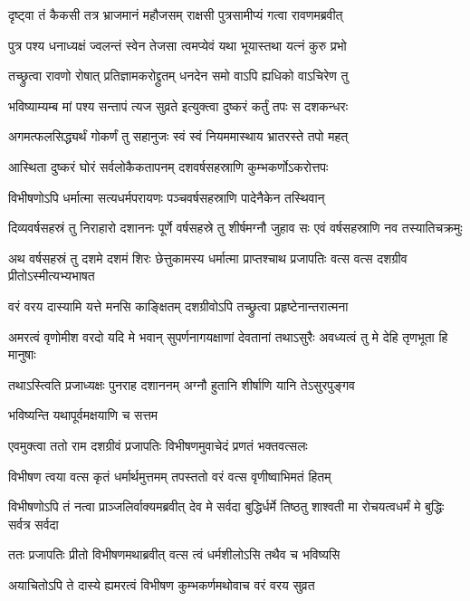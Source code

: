 \twolineshloka
{दृष्ट्वा तं कैकसी तत्र भ्राजमानं महौजसम्}
{राक्षसी पुत्रसामीप्यं गत्वा रावणमब्रवीत्} %

\twolineshloka
{पुत्र पश्य धनाध्यक्षं ज्वलन्तं स्वेन तेजसा}
{त्वमप्येवं यथा भूयास्तथा यत्नं कुरु प्रभो} %

\twolineshloka
{तच्छ्रुत्वा रावणो रोषात् प्रतिज्ञामकरोद्द्रुतम्}
{धनदेन समो वाऽपि ह्यधिको वाऽचिरेण तु} %

\twolineshloka
{भविष्याम्यम्ब मां पश्य सन्तापं त्यज सुव्रते}
{इत्युक्त्वा दुष्करं कर्तुं तपः स दशकन्धरः} %

\twolineshloka
{अगमत्फलसिद्ध्यर्थं गोकर्णं तु सहानुजः}
{स्वं स्वं नियममास्थाय भ्रातरस्ते तपो महत्} %

\twolineshloka
{आस्थिता दुष्करं घोरं सर्वलोकैकतापनम्}
{दशवर्षसहस्राणि कुम्भकर्णोऽकरोत्तपः} %

\twolineshloka
{विभीषणोऽपि धर्मात्मा सत्यधर्मपरायणः}
{पञ्चवर्षसहस्राणि पादेनैकेन तस्थिवान्} %

\threelineshloka
{दिव्यवर्षसहस्रं तु निराहारो दशाननः}
{पूर्णे वर्षसहस्रे तु शीर्षमग्नौ जुहाव सः}
{एवं वर्षसहस्राणि नव तस्यातिचक्रमुः} %

\threelineshloka
{अथ वर्षसहस्रं तु दशमे दशमं शिरः}
{छेत्तुकामस्य धर्मात्मा प्राप्तश्चाथ प्रजापतिः}
{वत्स वत्स दशग्रीव प्रीतोऽस्मीत्यभ्यभाषत} %

\twolineshloka
{वरं वरय दास्यामि यत्ते मनसि काङ्क्षितम्}
{दशग्रीवोऽपि तच्छ्रुत्वा प्रहृष्टेनान्तरात्मना} %

\threelineshloka
{अमरत्वं वृणोमीश वरदो यदि मे भवान्}
{सुपर्णनागयक्षाणां देवतानां तथाऽसुरैः}
{अवध्यत्वं तु मे देहि तृणभूता हि मानुषाः} %

\twolineshloka
{तथाऽस्त्विति प्रजाध्यक्षः पुनराह दशाननम्}
{अग्नौ हुतानि शीर्षाणि यानि तेऽसुरपुङ्गव} %

\onelineshloka
{भविष्यन्ति यथापूर्वमक्षयाणि च सत्तम} %

\twolineshloka
{एवमुक्त्वा ततो राम दशग्रीवं प्रजापतिः}
{विभीषणमुवाचेदं प्रणतं भक्तवत्सलः} %

\twolineshloka
{विभीषण त्वया वत्स कृतं धर्मार्थमुत्तमम्}
{तपस्ततो वरं वत्स वृणीष्वाभिमतं हितम्} %

\threelineshloka
{विभीषणोऽपि तं नत्वा प्राञ्जलिर्वाक्यमब्रवीत्}
{देव मे सर्वदा बुद्धिर्धर्मे तिष्ठतु शाश्वती}
{मा रोचयत्वधर्मं मे बुद्धिः सर्वत्र सर्वदा} %

\twolineshloka
{ततः प्रजापतिः प्रीतो विभीषणमथाब्रवीत्}
{वत्स त्वं धर्मशीलोऽसि तथैव च भविष्यसि} %

\twolineshloka
{अयाचितोऽपि ते दास्ये ह्यमरत्वं विभीषण}
{कुम्भकर्णमथोवाच वरं वरय सुव्रत} %

